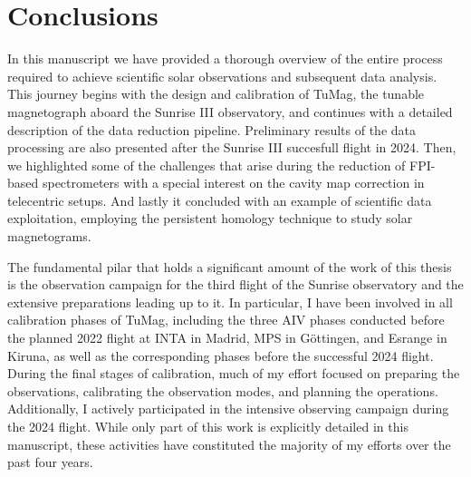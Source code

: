 \chapter{Conclusions}

In this manuscript we have provided a thorough overview of the entire process required to achieve scientific solar observations and subsequent data analysis. This journey begins with the design and calibration of TuMag, the tunable magnetograph aboard the Sunrise III observatory, and continues with a detailed description of the data reduction pipeline. Preliminary results of the data processing are also presented after the Sunrise III succesfull flight in 2024. Then, we highlighted some of the challenges that arise during the reduction of FPI-based spectrometers with a special interest on the cavity map correction in telecentric setups. And lastly it concluded with an example of scientific data exploitation, employing the persistent homology technique to study solar magnetograms.

The fundamental pilar that holds a significant amount of the work of this thesis is the observation campaign for the third flight of the Sunrise observatory and the extensive preparations leading up to it. In particular, I have been involved in all calibration phases of TuMag, including the three AIV phases conducted before the planned 2022 flight at INTA in Madrid, MPS in Göttingen, and Esrange in Kiruna, as well as the corresponding phases before the successful 2024 flight. During the final stages of calibration, much of my effort focused on preparing the observations, calibrating the observation modes, and planning the operations. Additionally, I actively participated in the intensive observing campaign during the 2024 flight. While only part of this work is explicitly detailed in this manuscript, these activities have constituted the majority of my efforts over the past four years.

